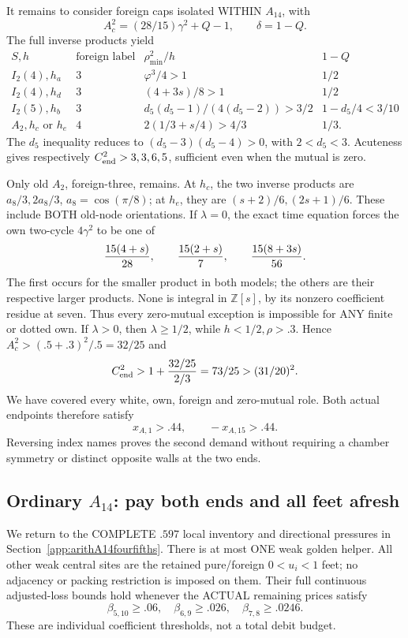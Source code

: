 It remains to consider foreign caps isolated
WITHIN \(A_{14}\), with
\[
                 A_c^2=(28/15)\gamma^2+Q-1,\qquad \delta=1-Q .
\]
The full inverse products yield
\[
 \begin{array}{c|c|c|c}
 S,h&\text{foreign label}&\rho_{\min}^2/h&1-Q\\ \hline
 I_2(4),h_a&3&\varphi^3/4>1&1/2\\
 I_2(4),h_d&3&(4+3s)/8>1&1/2\\
 I_2(5),h_b&3&d_5(d_5-1)/(4(d_5-2))>3/2&1-d_5/4<3/10\\
 A_2,h_c\text{ or }h_e&4&2(1/3+s/4)>4/3&1/3 .
 \end{array}
\]
The \(d_5\) inequality reduces to
\((d_5-3)(d_5-4)>0\), with \(2<d_5<3\).
Acuteness gives respectively
\(C_{\rm end}^2>3,3,6,5\), sufficient
even when the mutual is zero.

Only old \(A_2\), foreign-three, remains.
At \(h_c\), the two inverse products are
\(a_8/3,2a_8/3\), \(a_8=\cos(\pi/8)\);
at \(h_e\), they are
\((s+2)/6,(2s+1)/6\).
These include BOTH old-node orientations.
If \(\lambda=0\), the exact time equation
forces the own two-cycle \(4\gamma^2\)
to be one of
\[
                  {15(4+s)\over28},\qquad
                  {15(2+s)\over7},\qquad
                  {15(8+3s)\over56}.
\]
The first occurs for the smaller product
in both models; the others are their
respective larger products.
None is integral in \(\mathbb Z[s]\),
by its nonzero coefficient residue at seven.
Thus every zero-mutual exception is impossible
for ANY finite or dotted own.
If \(\lambda>0\), then \(\lambda\ge1/2\),
while \(h<1/2,\rho>.3\).
Hence \(A_c^2>(.5+.3)^2/.5=32/25\) and
\[
                    C_{\rm end}^2>
                      1+{32/25\over2/3}=73/25>(31/20)^2 .
\]
We have covered every white, own, foreign
and zero-mutual role.
Both actual endpoints therefore satisfy
\[
                     x_{A,1}>.44,\qquad -x_{A,15}>.44 .
\tag{A14ordends}\label{eq:arithA14ordinaryendpoint}
\]
Reversing index names proves the second
demand without requiring a chamber symmetry
or distinct opposite walls at the two ends.

\subsection{Ordinary \(A_{14}\): pay both ends and all feet afresh}
\label{app:arithA14ordinarycomposition}

We return to the COMPLETE \(.597\) local
inventory and directional pressures in
Section~\ref{app:arithA14fourfifths}.
There is at most ONE weak golden helper.
All other weak central sites are the
retained pure/foreign \(0<u_i<1\) feet;
no adjacency or packing restriction is
imposed on them.
Their full continuous adjusted-loss bounds
hold whenever the ACTUAL remaining prices
satisfy
\[
             \beta_{5,10}\ge.06,\quad
             \beta_{6,9}\ge.026,\quad
             \beta_{7,8}\ge.0246 .
\]
These are individual coefficient thresholds,
not a total debit budget.

